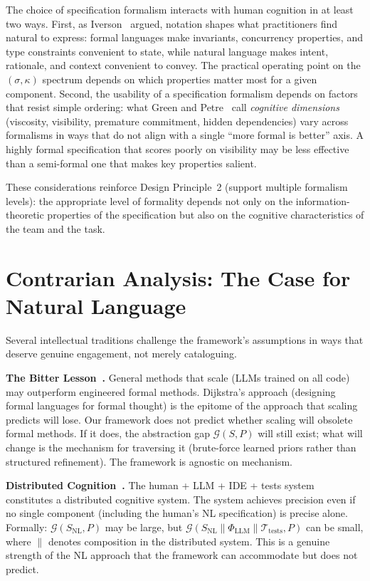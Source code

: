 \documentclass[11pt, a4paper, copyright]{googledeepmind}
\begin{document}
The choice of specification formalism interacts with human cognition in at least two ways. First, as Iverson~\citep{iverson1980notation} argued, notation shapes what practitioners find natural to express: formal languages make invariants, concurrency properties, and type constraints convenient to state, while natural language makes intent, rationale, and context convenient to convey. The practical operating point on the $(\sigma, \kappa)$ spectrum depends on which properties matter most for a given component. Second, the usability of a specification formalism depends on factors that resist simple ordering: what Green and Petre~\citep{green1996usability} call \emph{cognitive dimensions} (viscosity, visibility, premature commitment, hidden dependencies) vary across formalisms in ways that do not align with a single ``more formal is better'' axis. A highly formal specification that scores poorly on visibility may be less effective than a semi-formal one that makes key properties salient.

These considerations reinforce Design Principle~2 (support multiple formalism levels): the appropriate level of formality depends not only on the information-theoretic properties of the specification but also on the cognitive characteristics of the team and the task.


\section{Contrarian Analysis: The Case for Natural Language}
\label{sec:contrarian}

Several intellectual traditions challenge the framework's assumptions in ways that deserve genuine engagement, not merely cataloguing.

\textbf{The Bitter Lesson~\citep{sutton2019bitter}.} General methods that scale (LLMs trained on all code) may outperform engineered formal methods. Dijkstra's approach (designing formal languages for formal thought) is the epitome of the approach that scaling predicts will lose. Our framework does not predict whether scaling will obsolete formal methods. If it does, the abstraction gap $\mathcal{G}(S, P)$ will still exist; what will change is the mechanism for traversing it (brute-force learned priors rather than structured refinement). The framework is agnostic on mechanism.

\textbf{Distributed Cognition~\citep{hutchins1995cognition, clark2003natural}.} The human + LLM + IDE + tests system constitutes a distributed cognitive system. The system achieves precision even if no single component (including the human's NL specification) is precise alone. Formally: $\mathcal{G}(S_{\text{NL}}, P)$ may be large, but $\mathcal{G}(S_{\text{NL}} \parallel \Phi_{\text{LLM}} \parallel \mathcal{T}_{\text{tests}}, P)$ can be small, where $\parallel$ denotes composition in the distributed system. This is a genuine strength of the NL approach that the framework can accommodate but does not predict.
\end{document}
